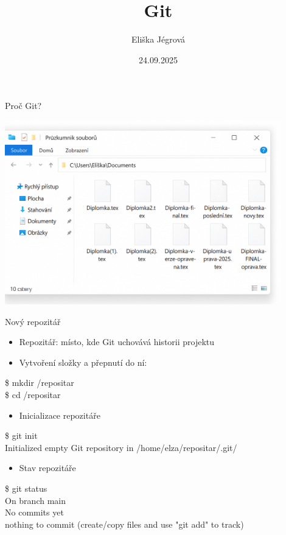 \documentclass{beamer}
\title{Git}
\author{Eliška Jégrová}
\date{24.09.2025}
\newcommand{\ts}{\raisebox{-0.25em}{\textasciitilde}}
\begin{document}
	
	\frame{\titlepage}
	
	\begin{frame}{Proč Git?}
		\begin{center}
			\includegraphics[width=0.9\textwidth]{why_git.png}
		\end{center}
	\end{frame}
	
	\begin{frame}[fragile]{Nový repozitář}
		
		\begin{itemize}
			\item Repozitář: místo, kde Git uchovává historii projektu
			\item Vytvoření složky a přepnutí do ní:
		\end{itemize}
		
	{\ttfamily\small
		\$ mkdir \ts/repositar \\
		\$ cd \ts/repositar \\
	}
	
		\hspace{0.5cm}
		\begin{itemize}
			\item Inicializace repozitáře
		\end{itemize}
		
	
	{\ttfamily\small
		\$ git init \\
		Initialized empty Git repository in /home/elza/repositar/.git/ \\
	}
		
		\hspace{0.5cm}
		\begin{itemize}
			\item Stav repozitáře
		\end{itemize}
		
	{\ttfamily\small
		\$ git status \\
		On branch main \\
		No commits yet \\
		nothing to commit (create/copy files and use "git add" to track)
	}
		
	\end{frame}
	
\end{document}
